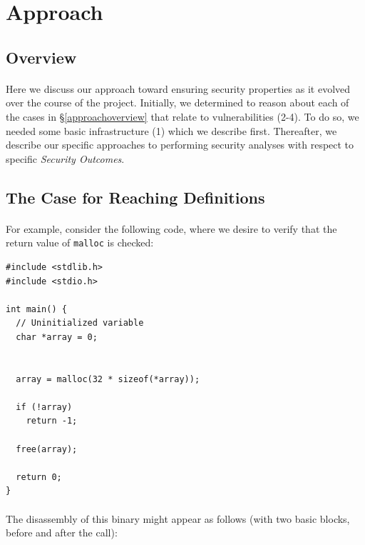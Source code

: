 \documentclass[letterpaper,11pt]{article}
\begin{document}
\section{Approach}

\subsection{Overview}
\paragraph{}
Here we discuss our approach toward ensuring security properties as it evolved
over the course of the project. Initially, we determined to reason about each
of the cases in \S\ref{approachoverview} that relate to vulnerabilities
(2-4). To do so, we needed some basic infrastructure (1) which we describe
first. Thereafter, we describe our specific approaches to performing
security analyses with respect to specific \emph{Security Outcomes}.

\subsection{The Case for Reaching Definitions}

\paragraph{}
For example, consider the following code, where we desire to verify
that the return value of \texttt{malloc} is checked:

\begin{center}
\lstset{language=C, label=malloccheck,
caption=malloc.c, breaklines=true, basicstyle=\tiny, numbers=left}
\begin{lstlisting}
#include <stdlib.h>
#include <stdio.h>

int main() {
  // Uninitialized variable
  char *array = 0;


  array = malloc(32 * sizeof(*array));

  if (!array)
    return -1;

  free(array);

  return 0;
}
\end{lstlisting}
\end{center}

\paragraph{}
The disassembly of this binary might appear as follows (with two basic blocks,
before and after the call): 
\end{document}
